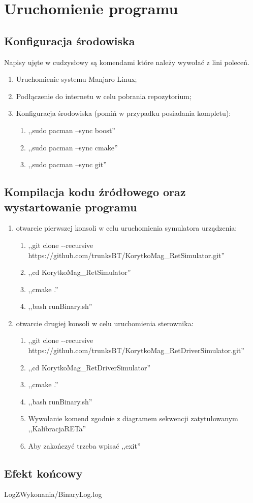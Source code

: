 \chapter{Uruchomienie programu}
    \section{Konfiguracja środowiska}
    Napisy ujęte w cudzysłowy są komendami które należy wywołać z lini poleceń.
    \begin{enumerate}
        \item Uruchomienie systemu Manjaro Linux;
        \item Podłączenie do internetu w celu pobrania repozytorium;
        \item Konfiguracja środowiska (pomiń w przypadku posiadania kompletu):
        \begin{enumerate}
            \item ,,sudo pacman --sync boost''
            \item ,,sudo pacman --sync cmake''
            \item ,,sudo pacman --sync git''
        \end{enumerate}
    \end{enumerate}
    \section{Kompilacja kodu źródłowego oraz wystartowanie programu}
    \begin{enumerate}
        \item otwarcie pierwszej konsoli w celu uruchomienia symulatora urządzenia:
		\begin{enumerate}
			\item ,,git clone -{}-recursive https://github.com/trunksBT/KorytkoMag\_RetSimulator.git''
			\item ,,cd KorytkoMag\_RetSimulator''
			\item ,,cmake .''
			\item ,,bash runBinary.sh''
		\end{enumerate}
		\item otwarcie drugiej konsoli w celu uruchomienia sterownika:
		\begin{enumerate}
			\item ,,git clone -{}-recursive https://github.com/trunksBT/KorytkoMag\_RetDriverSimulator.git''
			\item ,,cd KorytkoMag\_RetDriverSimulator''
			\item ,,cmake .''
			\item ,,bash runBinary.sh''
			\item Wywołanie komend zgodnie z diagramem sekwencji zatytułowanym ,,KalibracjaRETa''
			\item Aby zakończyć trzeba wpisać ,,exit''
		\end{enumerate}
    \end{enumerate}
    \newpage
    \section{Efekt końcowy}
        
        {LogZWykonania/BinaryLog.log}
